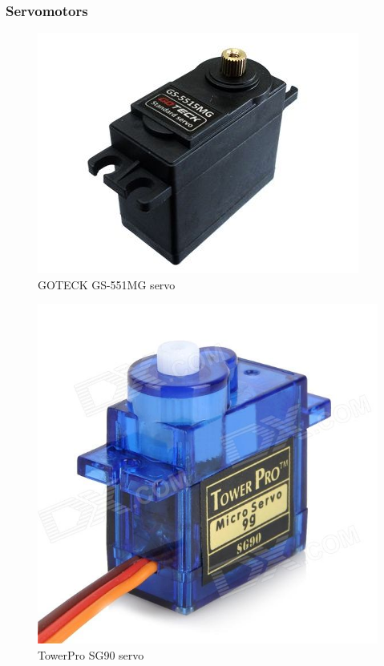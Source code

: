 	\subsubsection{Servomotors}

		\begin{figure}[H]
			\centering
			\includegraphics[scale=0.5]{images/ProjectComponents/servo1.jpg}
			\caption{GOTECK GS-551MG servo }
			\label{}
		\end{figure}
		\bigskip


		\begin{figure}[H]
			\centering
			\includegraphics[scale=0.25]{images/ProjectComponents/servo2.jpg}
			\caption{TowerPro SG90 servo }
			\label{}
		\end{figure}
		\bigskip
















